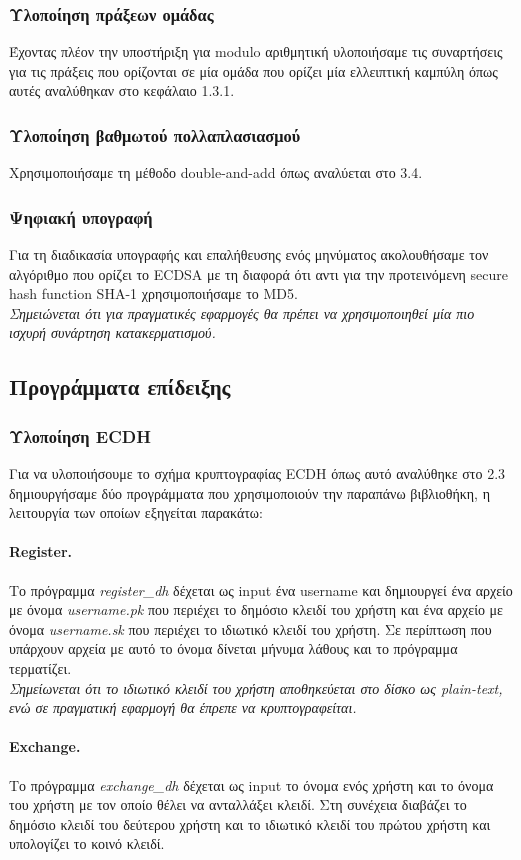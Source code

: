 \documentclass[12pt]{article}
\begin{document}
\subsubsection{Υλοποίηση πράξεων ομάδας}
Έχοντας πλέον την υποστήριξη για modulo αριθμητική υλοποιήσαμε τις συναρτήσεις για τις πράξεις που ορίζονται σε μία ομάδα που ορίζει μία ελλειπτική καμπύλη όπως αυτές αναλύθηκαν στο κεφάλαιο 1.3.1.
\subsubsection{Υλοποίηση βαθμωτού πολλαπλασιασμού}
Χρησιμοποιήσαμε τη μέθοδο double-and-add όπως αναλύεται στο 3.4.
\subsubsection{Ψηφιακή υπογραφή}
Για τη διαδικασία υπογραφής και επαλήθευσης ενός μηνύματος ακολουθήσαμε τον αλγόριθμο που ορίζει το ECDSA με τη διαφορά ότι αντι για την προτεινόμενη secure hash function SHA-1 χρησιμοποιήσαμε το MD5.
\\ \medskip
\textit{Σημειώνεται ότι για πραγματικές εφαρμογές θα πρέπει να χρησιμοποιηθεί μία πιο ισχυρή συνάρτηση κατακερματισμού.
}\subsection{Προγράμματα επίδειξης}
\subsubsection{Υλοποίηση ECDH}
Για να υλοποιήσουμε το σχήμα κρυπτογραφίας ECDH όπως αυτό αναλύθηκε στο 2.3 δημιουργήσαμε δύο προγράμματα που χρησιμοποιούν την παραπάνω βιβλιοθήκη, η λειτουργία των οποίων εξηγείται παρακάτω:
\paragraph{Register.} Το πρόγραμμα \emph{register\_dh} δέχεται ως input ένα username και δημιουργεί ένα αρχείο με όνομα \emph{username.pk} που περιέχει το δημόσιο κλειδί του χρήστη και ένα αρχείο με όνομα \emph{username.sk} που περιέχει το ιδιωτικό κλειδί του χρήστη. Σε περίπτωση που υπάρχουν αρχεία με αυτό το όνομα δίνεται μήνυμα λάθους και το πρόγραμμα τερματίζει. \\
\medskip
\textit{Σημείωνεται ότι το ιδιωτικό κλειδί του χρήστη αποθηκεύεται στο δίσκο ως plain-text,  ενώ σε πραγματική εφαρμογή θα έπρεπε να κρυπτογραφείται.}
\paragraph{Exchange.} Το πρόγραμμα \emph{exchange\_dh} δέχεται ως input το όνομα ενός χρήστη και το όνομα του χρήστη με τον οποίο θέλει να ανταλλάξει κλειδί. Στη συνέχεια διαβάζει το δημόσιο κλειδί του δεύτερου χρήστη και το ιδιωτικό κλειδί του πρώτου χρήστη και υπολογίζει το κοινό κλειδί.
\end{document}
